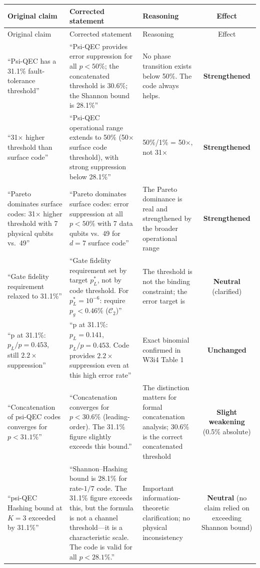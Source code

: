\documentclass[11pt]{article}
\theoremstyle{definition}
\theoremstyle{remark}
\begin{document}
\begin{longtable}{@{}p{4cm}p{4.5cm}p{4.5cm}c@{}}
\toprule
Original claim & Corrected statement & Reasoning & Effect \\
\midrule
\endfirsthead
\toprule
Original claim & Corrected statement & Reasoning & Effect \\
\midrule
\endhead

``Psi-QEC has a 31.1\% fault-tolerance threshold'' &
``Psi-QEC provides error suppression for all $p < 50\%$; the concatenated threshold is 30.6\%; the Shannon bound is 28.1\%'' &
No phase transition exists below 50\%. The code always helps. &
\textbf{Strengthened} \\
\midrule

``31$\times$ higher threshold than surface code'' &
``Psi-QEC operational range extends to 50\% (50$\times$ surface code threshold), with strong suppression below 28.1\%'' &
50\%/1\% = 50$\times$, not 31$\times$ &
\textbf{Strengthened} \\
\midrule

``Pareto dominates surface codes: 31$\times$ higher threshold with 7 physical qubits vs.\ 49'' &
``Pareto dominates surface codes: error suppression at all $p < 50\%$ with 7 data qubits vs.\ 49 for $d=7$ surface code'' &
The Pareto dominance is real and strengthened by the broader operational range &
\textbf{Strengthened} \\
\midrule

``Gate fidelity requirement relaxed to 31.1\%'' &
``Gate fidelity requirement set by target $p_L^*$, not by code threshold. For $p_L^* = 10^{-6}$: require $p_g < 0.46\%$ ($\mathcal{C}_2$)'' &
The threshold is not the binding constraint; the error target is &
\textbf{Neutral} (clarified) \\
\midrule

``p at 31.1\%: $p_L/p = 0.453$, still $2.2\times$ suppression'' &
``p at 31.1\%: $p_L = 0.141$, $p_L/p = 0.453$. Code provides $2.2\times$ suppression even at this high error rate'' &
Exact binomial confirmed in W3i4 Table 1 &
\textbf{Unchanged} \\
\midrule

``Concatenation of psi-QEC codes converges for $p < 31.1\%$'' &
``Concatenation converges for $p < 30.6\%$ (leading-order). The 31.1\% figure slightly exceeds this bound.'' &
The distinction matters for formal concatenation analysis; 30.6\% is the correct concatenated threshold &
\textbf{Slight weakening} (0.5\% absolute) \\
\midrule

``psi-QEC Hashing bound at $K=3$ exceeded by 31.1\%'' &
``Shannon--Hashing bound is 28.1\% for rate-$1/7$ code. The 31.1\% figure exceeds this, but the formula is not a channel threshold---it is a characteristic scale. The code is valid for all $p < 28.1\%$.'' &
Important information-theoretic clarification; no physical inconsistency &
\textbf{Neutral} (no claim relied on exceeding Shannon bound) \\

\bottomrule
\end{longtable}
\end{document}
